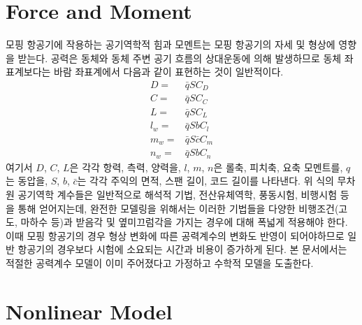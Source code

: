 \documentclass[a4paper, 12pt]{report}
\begin{document}
	\section{Force and Moment}
	
	모핑 항공기에 작용하는 공기역학적 힘과 모멘트는 모핑 항공기의 자세 및 형상에 영향을 받는다.
	공력은 동체와 동체 주변 공기 흐름의 상대운동에 의해 발생하므로 동체 좌표계보다는 바람 좌표계에서 다음과 같이 표현하는 것이 일반적이다.
	\begin{align}
		D =& \bar{q}SC_D \\
		C =& \bar{q}SC_C \\
		L =& \bar{q}SC_L \\
		l_w =& \bar{q}SbC_l \\
		m_w =& \bar{q}S\bar{c}C_m \\
		n_w =& \bar{q}SbC_n
	\end{align}
	여기서 $D$, $C$, $L$은 각각 항력, 측력, 양력을, $l$, $m$, $n$은 롤축, 피치축, 요축 모멘트를, $q$는 동압을, $S$, $b$, $\bar{c}$는 각각 주익의 면적, 스팬 길이, 코드 길이를 나타낸다.
	위 식의 무차원 공기역학 계수들은 일반적으로 해석적 기법, 전산유체역학, 풍동시험, 비행시험 등을 통해 얻어지는데, 완전한 모델링을 위해서는 이러한 기법들을 다양한 비행조건(고도, 마하수 등)과 받음각 및 옆미끄럼각을 가지는 경우에 대해 폭넓게 적용해야 한다.
	이때 모핑 항공기의 경우 형상 변화에 따른 공력계수의 변화도 반영이 되어야하므로 일반 항공기의 경우보다 시험에 소요되는 시간과 비용이 증가하게 된다.
	본 문서에서는 적절한 공력계수 모델이 이미 주어졌다고 가정하고 수학적 모델을 도출한다.
	
	\section{Nonlinear Model}
	
\end{document}
